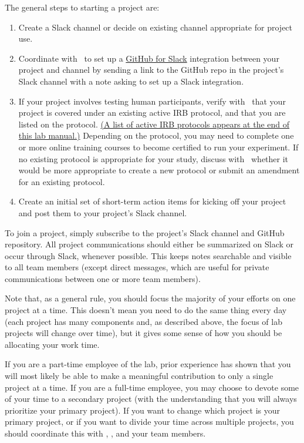 \documentclass{tufte-book} %
\begin{document}
The general steps to starting a project are:
\begin{enumerate}

  \item Create a Slack channel or decide on existing channel
    appropriate for project use.
  \item Coordinate with \director~to set up a \href{https://get.slack.help/hc/en-us/articles/232289568-GitHub-for-Slack}{GitHub
      for Slack} integration between your project and channel by sending a link to the GitHub repo in the project's Slack channel with a note asking to set up a Slack integration.
   \item If your project involves testing human participants, verify
     with \director~that your project is covered under an existing
     active IRB protocol, and that you are listed on the protocol. \hyperref[ch:irb]{(A list of
active IRB protocols appears at the end of this lab manual.)}
Depending on the protocol, you may need to complete one or more online
training courses to become certified to run your experiment.  If no
existing protocol is appropriate for your study, discuss with
\director~whether it would be more appropriate to create a new protocol or
submit an amendment for an existing protocol.
    \item Create an initial set of short-term action items for kicking
      off your project and post them to your project's Slack channel.
\end{enumerate}


{}

\noindent To join a project, simply subscribe to the project's Slack channel and
GitHub repository.  All project communications should either be
summarized on Slack or occur through Slack, whenever possible.  This
keeps notes searchable and visible to all team members (except direct
messages, which are useful for private communications between one or
more team members).

Note that, as a general rule, you should focus the majority of your
efforts on one project at a time.  This doesn't mean you need to do
the same thing every day (each project has many components and, as
described above, the focus of lab projects will change over time), but
it gives some sense of how you should be allocating your work time.

If you are a part-time employee of the lab, prior experience has shown
that you will most likely be able to make a meaningful contribution to
only a single project at a time.  If you are a full-time employee, you
may choose to devote some of your time to a secondary project (with
the understanding that you will always prioritize your primary
project).  If you want to change which project is your primary
project, or if you want to divide your time across multiple projects,
you should coordinate this with \director, \coordinator, and your team
members.
\end{document}
